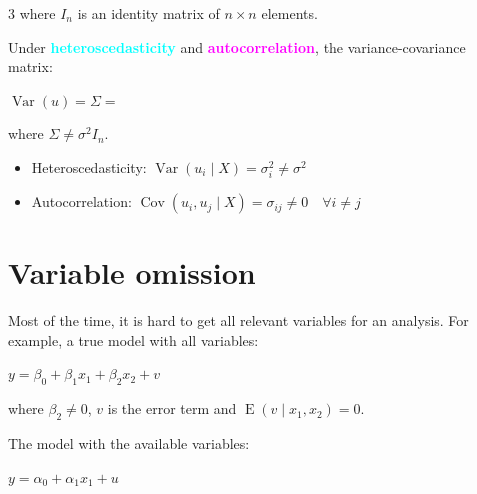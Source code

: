 \documentclass[10pt, a4paper, landscape]{article}
\DeclareMathOperator{\E}{E}
\DeclareMathOperator{\Var}{Var}
\DeclareMathOperator{\Cov}{Cov}
\begin{document}
\begin{multicols}{3}
\quad where \( I_{n} \) is an identity matrix of \( n \times n \) elements.

Under \textcolor{cyan}{\textbf{heteroscedasticity}} and \textcolor{magenta}{\textbf{autocorrelation}}, the variance-covariance matrix:

\begin{center}
	\( \Var(u) = \Sigma = \)
\end{center}

\quad where \( \Sigma \neq \sigma^{2} I_{n} \).

\begin{itemize}[leftmargin=*]
	\item Heteroscedasticity: \( \Var(u_{i} \mid X) = \sigma_{i}^{2} \neq \sigma^{2} \)
	\item Autocorrelation: \( \Cov(u_{i}, u_{j} \mid X) = \sigma_{ij} \neq 0 \quad \forall i \neq j \)
\end{itemize}

\section*{Variable omission}

Most of the time, it is hard to get all relevant variables for an analysis. For example, a true model with all variables:

\begin{center}
	\( y = \beta_{0} + \beta_{1} x_{1} + \beta_{2} x_{2} + v \)
\end{center}

\quad where \( \beta_{2} \neq 0 \), \( v \) is the error term and \( \E(v \mid x_{1}, x_{2}) = 0 \).

The model with the available variables:

\begin{center}
	\( y = \alpha_{0} + \alpha_{1} x_{1} + u \)
\end{center}


\end{multicols}
\end{document}
